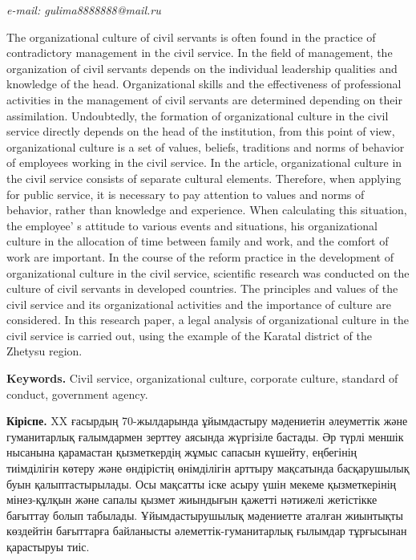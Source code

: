 \emph{e-mail: gulima8888888@mail.ru}

The organizational culture of civil servants is often found in the
practice of contradictory management in the civil service. In the field
of management, the organization of civil servants depends on the
individual leadership qualities and knowledge of the head.
Organizational skills and the effectiveness of professional activities
in the management of civil servants are determined depending on their
assimilation. Undoubtedly, the formation of organizational culture in
the civil service directly depends on the head of the institution, from
this point of view, organizational culture is a set of values, beliefs,
traditions and norms of behavior of employees working in the civil
service. In the article, organizational culture in the civil service
consists of separate cultural elements. Therefore, when applying for
public service, it is necessary to pay attention to values and norms of
behavior, rather than knowledge and experience. When calculating this
situation, the employee' s attitude to various events and
situations, his organizational culture in the allocation of time between
family and work, and the comfort of work are important. In the course of
the reform practice in the development of organizational culture in the
civil service, scientific research was conducted on the culture of civil
servants in developed countries. The principles and values of the civil
service and its organizational activities and the importance of culture
are considered. In this research paper, a legal analysis of
organizational culture in the civil service is carried out, using the
example of the Karatal district of the Zhetysu region.

{\bfseries Keywords.} Civil service, organizational culture, corporate
culture, standard of conduct, government agency.

{\bfseries Кіріспе.} XX ғасырдың 70-жылдарында ұйымдастыру мәдениетін
әлеуметтік және гуманитарлық ғалымдармен зерттеу аясында жүргізіле
бастады. Әр түрлі меншік нысанына қарамастан қызметкердің жұмыс сапасын
күшейту, еңбегінің тиімділігін көтеру және өндірістің өнімділігін
арттыру мақсатында басқарушылық буын қалыптастырылады. Осы мақсатты іске
асыру үшін мекеме қызметкерінің мінез-құлқын және сапалы қызмет
жиындығын қажетті нәтижелі жетістікке бағыттау болып табылады.
Ұйымдастырушылық мәдениетте аталған жиынтықты көздейтін бағыттарға
байланысты әлеметтік-гуманитарлық ғылымдар тұрғысынан қарастыруы тиіс.

